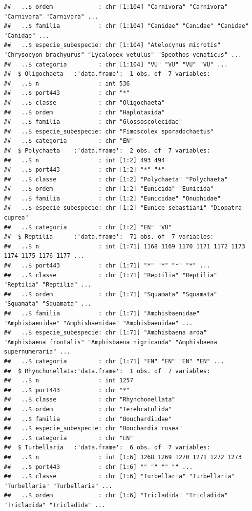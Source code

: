 \documentclass[
]{article}
\begin{document}
\begin{verbatim}
##   ..$ ordem             : chr [1:104] "Carnivora" "Carnivora" "Carnivora" "Carnivora" ...
##   ..$ familia           : chr [1:104] "Canidae" "Canidae" "Canidae" "Canidae" ...
##   ..$ especie_subespecie: chr [1:104] "Atelocynus microtis" "Chrysocyon brachyurus" "Lycalopex vetulus" "Speothos venaticus" ...
##   ..$ categoria         : chr [1:104] "VU" "VU" "VU" "VU" ...
##  $ Oligochaeta   :'data.frame':  1 obs. of  7 variables:
##   ..$ n                 : int 536
##   ..$ port443           : chr "*"
##   ..$ classe            : chr "Oligochaeta"
##   ..$ ordem             : chr "Haplotaxida"
##   ..$ familia           : chr "Glossoscolecidae"
##   ..$ especie_subespecie: chr "Fimoscolex sporadochaetus"
##   ..$ categoria         : chr "EN"
##  $ Polychaeta    :'data.frame':  2 obs. of  7 variables:
##   ..$ n                 : int [1:2] 493 494
##   ..$ port443           : chr [1:2] "*" "*"
##   ..$ classe            : chr [1:2] "Polychaeta" "Polychaeta"
##   ..$ ordem             : chr [1:2] "Eunicida" "Eunicida"
##   ..$ familia           : chr [1:2] "Eunicidae" "Onuphidae"
##   ..$ especie_subespecie: chr [1:2] "Eunice sebastiani" "Diopatra cuprea"
##   ..$ categoria         : chr [1:2] "EN" "VU"
##  $ Reptilia      :'data.frame':  71 obs. of  7 variables:
##   ..$ n                 : int [1:71] 1168 1169 1170 1171 1172 1173 1174 1175 1176 1177 ...
##   ..$ port443           : chr [1:71] "*" "*" "*" "*" ...
##   ..$ classe            : chr [1:71] "Reptilia" "Reptilia" "Reptilia" "Reptilia" ...
##   ..$ ordem             : chr [1:71] "Squamata" "Squamata" "Squamata" "Squamata" ...
##   ..$ familia           : chr [1:71] "Amphisbaenidae" "Amphisbaenidae" "Amphisbaenidae" "Amphisbaenidae" ...
##   ..$ especie_subespecie: chr [1:71] "Amphisbaena arda" "Amphisbaena frontalis" "Amphisbaena nigricauda" "Amphisbaena supernumeraria" ...
##   ..$ categoria         : chr [1:71] "EN" "EN" "EN" "EN" ...
##  $ Rhynchonellata:'data.frame':  1 obs. of  7 variables:
##   ..$ n                 : int 1257
##   ..$ port443           : chr "*"
##   ..$ classe            : chr "Rhynchonellata"
##   ..$ ordem             : chr "Terebratulida"
##   ..$ familia           : chr "Bouchardiidae"
##   ..$ especie_subespecie: chr "Bouchardia rosea"
##   ..$ categoria         : chr "EN"
##  $ Turbellaria   :'data.frame':  6 obs. of  7 variables:
##   ..$ n                 : int [1:6] 1268 1269 1270 1271 1272 1273
##   ..$ port443           : chr [1:6] "" "" "" "" ...
##   ..$ classe            : chr [1:6] "Turbellaria" "Turbellaria" "Turbellaria" "Turbellaria" ...
##   ..$ ordem             : chr [1:6] "Tricladida" "Tricladida" "Tricladida" "Tricladida" ...

\end{verbatim}
\end{document}
